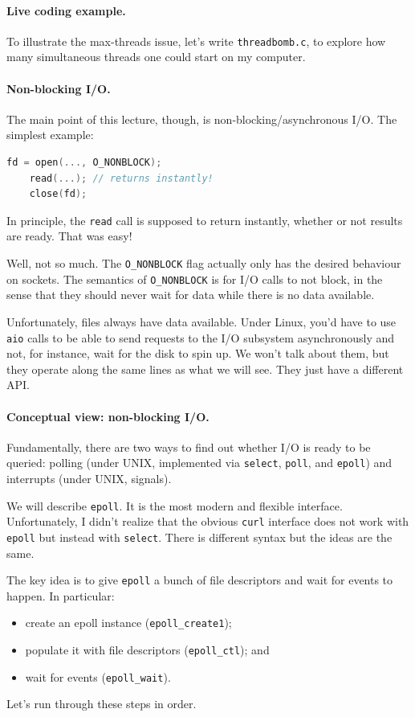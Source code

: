 \paragraph{Live coding example.} To illustrate the max-threads
issue, let's write {\tt threadbomb.c}, to explore how many simultaneous threads
one could start on my computer.

\paragraph{Non-blocking I/O.} The main point of this lecture, though,
is non-blocking/asynchronous I/O. The simplest example:

\begin{lstlisting}[language=C]
    fd = open(..., O_NONBLOCK);
    read(...); // returns instantly!
    close(fd);
\end{lstlisting}

In principle, the {\tt read} call is supposed to return instantly,
whether or not results are ready. That was easy!

Well, not so much. The {\tt O\_NONBLOCK} flag actually only has the
desired behaviour on sockets. The semantics of {\tt O\_NONBLOCK} is
for I/O calls to not block, in the sense that they should never wait
for data while there is no data available.

Unfortunately, files always have data available. Under Linux, you'd have
to use {\tt aio} calls to be able to send requests to the I/O subsystem
asynchronously and not, for instance, wait for the disk to spin up.
We won't talk about them, but they operate along the same lines as what
we will see. They just have a different API.

\paragraph{Conceptual view: non-blocking I/O.} Fundamentally,
there are two ways to find out whether I/O is ready to be queried:
polling (under UNIX, implemented via {\tt select}, {\tt poll},
and {\tt epoll}) and interrupts (under UNIX, signals).


We will describe {\tt epoll}. It is the most modern and
flexible interface. Unfortunately, I didn't realize that the obvious
{\tt curl} interface does not work with {\tt epoll} but instead with
{\tt select}.  There is different syntax but the ideas are the same.

The key idea is to give {\tt epoll} a bunch of file descriptors and
wait for events to happen. In particular:
     \begin{itemize}
       \item create an epoll instance ({\tt epoll\_create1});
       \item populate it with file descriptors ({\tt epoll\_ctl}); and
       \item wait for events ({\tt epoll\_wait}).
     \end{itemize}
Let's run through these steps in order.

